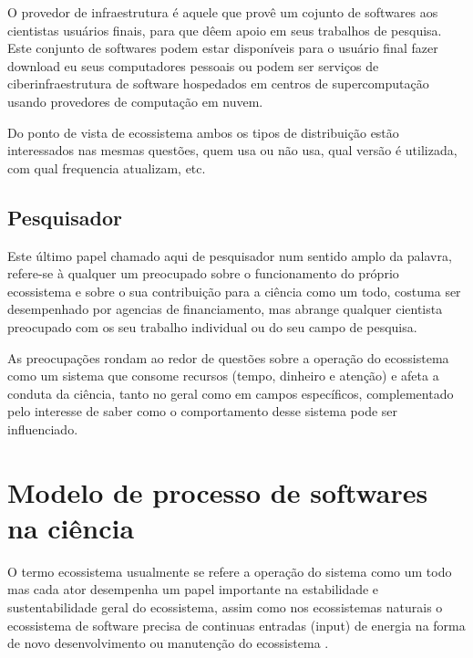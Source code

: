 O provedor de infraestrutura é aquele que provê um cojunto de softwares aos
cientistas usuários finais, para que dêem apoio em seus trabalhos de pesquisa.
Este conjunto de softwares podem estar disponíveis para o usuário final fazer
download eu seus computadores pessoais ou podem ser serviços de
ciberinfraestrutura de software hospedados em centros de supercomputação
usando provedores de computação em nuvem.

Do ponto de vista de ecossistema ambos os tipos de distribuição estão
interessados nas mesmas questões, quem usa ou não usa, qual versão é utilizada,
com qual frequencia atualizam, etc.

\subsection{Pesquisador}

Este último papel chamado aqui de pesquisador num sentido amplo da palavra,
refere-se à qualquer um preocupado sobre o funcionamento do próprio ecossistema
e sobre o sua contribuição para a ciência como um todo, costuma ser
desempenhado por agencias de financiamento, mas abrange qualquer cientista
preocupado com os seu trabalho individual ou do seu campo de pesquisa.

As preocupações rondam ao redor de questões sobre a operação do ecossistema como
um sistema que consome recursos (tempo, dinheiro e atenção) e afeta a conduta da
ciência, tanto no geral como em campos específicos, complementado pelo interesse
de saber como o comportamento desse sistema pode ser influenciado.


\section{Modelo de processo de softwares na ciência}


O termo ecossistema usualmente se refere a operação do sistema como um todo mas
cada ator desempenha um papel importante na estabilidade e sustentabilidade
geral do ecossistema, assim como nos ecossistemas naturais o ecossistema de
software precisa de continuas entradas (input) de energia na forma de novo
desenvolvimento ou manutenção do ecossistema \cite{dhungana2010software}.


